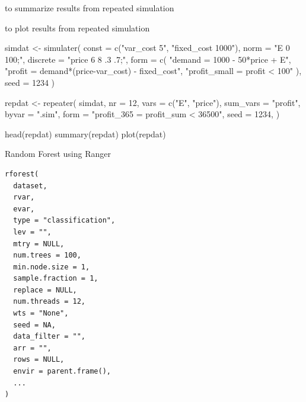 \documentclass[a4paper]{book}
\begin{document}
%
\begin{SeeAlso}
 to summarize results from repeated simulation

 to plot results from repeated simulation
\end{SeeAlso}
%
\begin{Examples}
\begin{ExampleCode}
simdat <- simulater(
  const = c("var_cost 5", "fixed_cost 1000"),
  norm = "E 0 100;",
  discrete = "price 6 8 .3 .7;",
  form = c(
    "demand = 1000 - 50*price + E",
    "profit = demand*(price-var_cost) - fixed_cost",
    "profit_small = profit < 100"
  ),
  seed = 1234
)

repdat <- repeater(
  simdat,
  nr = 12,
  vars = c("E", "price"),
  sum_vars = "profit",
  byvar = ".sim",
  form = "profit_365 = profit_sum < 36500",
  seed = 1234,
)

head(repdat)
summary(repdat)
plot(repdat)

\end{ExampleCode}
\end{Examples}
%
\begin{Description}
Random Forest using Ranger
\end{Description}
%
\begin{Usage}
\begin{verbatim}
rforest(
  dataset,
  rvar,
  evar,
  type = "classification",
  lev = "",
  mtry = NULL,
  num.trees = 100,
  min.node.size = 1,
  sample.fraction = 1,
  replace = NULL,
  num.threads = 12,
  wts = "None",
  seed = NA,
  data_filter = "",
  arr = "",
  rows = NULL,
  envir = parent.frame(),
  ...
)
\end{verbatim}
\end{Usage}
%
\end{document}
